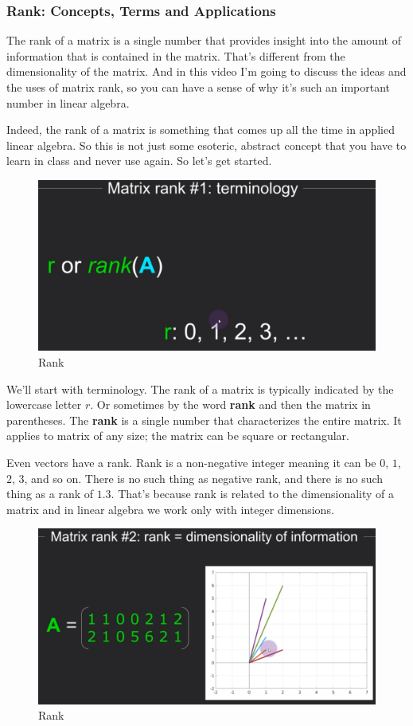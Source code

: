 \documentclass[fleqn,10pt]{olplainarticle}
\theoremstyle{definition}
\theoremstyle{remark}
\begin{document}
\subsubsection*{Rank: Concepts, Terms and Applications}

The rank of a matrix is a single number that provides insight into the amount of information that is contained in the matrix. That's different from the dimensionality of the matrix. And in this video I'm going to discuss the ideas and the uses of matrix rank, so you can have a sense of why it's such an important number in linear algebra.

Indeed, the rank of a matrix is something that comes up all the time in applied linear algebra. So this is not just some esoteric, abstract concept that you have to learn in class and never use again. So let's get started.

\begin{figure}[ht]
	\centering
	\includegraphics[width=0.3\linewidth]{images/rank-01.png}
	\caption{Rank}
	\label{fig:rank_01}
\end{figure}

We'll start with terminology. The rank of a matrix is typically indicated by the lowercase letter $r$. Or sometimes by the word \textbf{rank }and then the matrix in parentheses. The \textbf{rank }is a single number that characterizes the entire matrix. It applies to matrix of any size; the matrix can be square or rectangular.

Even vectors have a rank. Rank is a non-negative integer meaning it can be $0$, $1$, $2$, $3$, and so on. There is no such thing as negative rank, and there is no such thing as a rank of $1.3$. That's because rank is related to the dimensionality of a matrix and in linear algebra we work only with integer dimensions.

\begin{figure}[ht]
	\centering
	\includegraphics[width=0.6\linewidth]{images/rank-02.png}
	\caption{Rank}
	\label{fig:rank_02}
\end{figure}
\end{document}
